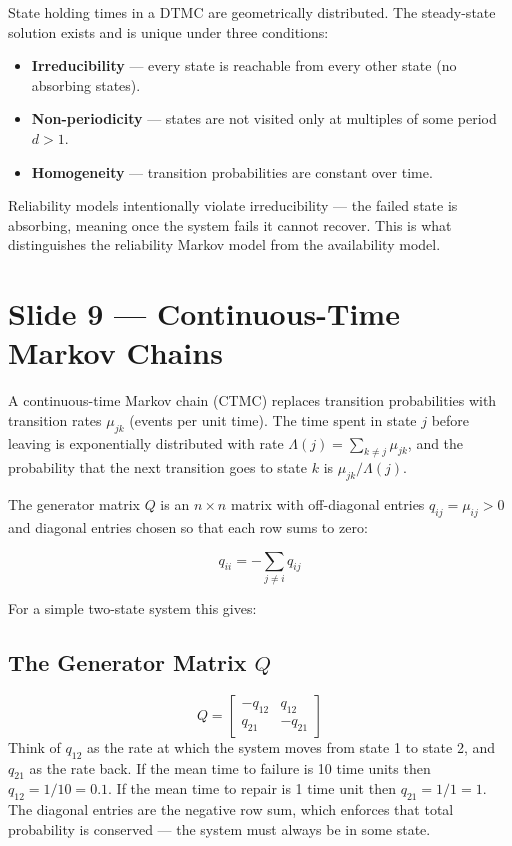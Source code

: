 State holding times in a DTMC are geometrically distributed. The 
steady-state solution exists and is unique under three conditions:

\begin{notebox}
    \begin{itemize}
        \item \textbf{Irreducibility} — every state is reachable from 
        every other state (no absorbing states).
        \item \textbf{Non-periodicity} — states are not visited only at 
        multiples of some period $d > 1$.
        \item \textbf{Homogeneity} — transition probabilities are constant 
        over time.
    \end{itemize}
\end{notebox}
\begin{warnbox}
    Reliability models intentionally violate irreducibility — the failed 
    state is absorbing, meaning once the system fails it cannot recover. 
    This is what distinguishes the reliability Markov model from the 
    availability model.
\end{warnbox}

\section*{Slide 9 — Continuous-Time Markov Chains}

A continuous-time Markov chain (CTMC) replaces transition probabilities 
with transition rates $\mu_{jk}$ (events per unit time). The time spent 
in state $j$ before leaving is exponentially distributed with rate 
$\Lambda(j) = \sum_{k \neq j} \mu_{jk}$, and the probability that the 
next transition goes to state $k$ is $\mu_{jk} / \Lambda(j)$.

The generator matrix $Q$ is an $n \times n$ matrix with off-diagonal 
entries $q_{ij} = \mu_{ij} > 0$ and diagonal entries chosen so that 
each row sums to zero:

\[
    q_{ii} = -\sum_{j \neq i} q_{ij}
\]

For a simple two-state system this gives:

\subsection*{The Generator Matrix $Q$}
\[
    Q = \begin{bmatrix} -q_{12} & q_{12} \\ q_{21} & -q_{21} \end{bmatrix}
\]
Think of $q_{12}$ as the rate at which the system moves from state 1 
to state 2, and $q_{21}$ as the rate back. If the mean time to failure 
is 10 time units then $q_{12} = 1/10 = 0.1$. If the mean time to repair 
is 1 time unit then $q_{21} = 1/1 = 1$. The diagonal entries are the 
negative row sum, which enforces that total probability is conserved --- 
the system must always be in some state.


